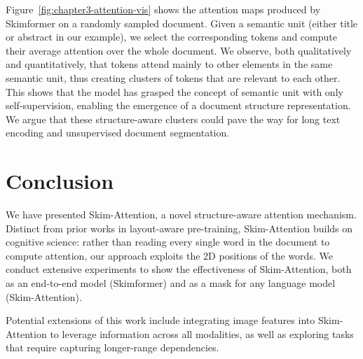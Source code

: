 Figure~\ref{fig:chapter3-attention-vis} shows the attention maps produced by Skimformer on a randomly sampled document. Given a semantic unit (either title or abstract in our example), we select the corresponding tokens and compute their average attention over the whole document. We observe, both qualitatively and quantitatively, that tokens attend mainly to other elements in the same semantic unit, thus creating clusters of tokens that are relevant to each other. This shows that the model has grasped the concept of semantic unit with only self-supervision, enabling the emergence of a document structure representation. We argue that these structure-aware clusters could pave the way for long text encoding and unsupervised document segmentation.

\section{Conclusion}

We have presented Skim-Attention, a novel structure-aware attention mechanism. Distinct from prior works in layout-aware pre-training, Skim-Attention builds on cognitive science: rather than reading every single word in the document to compute attention, our approach exploits the 2D positions of the words. We conduct extensive experiments to show the effectiveness of Skim-Attention, both as an end-to-end model (Skimformer) and as a mask for any language model (Skim-Attention).

Potential extensions of this work include integrating image features into Skim-Attention to leverage information across all modalities, as well as exploring tasks that require capturing longer-range dependencies.





